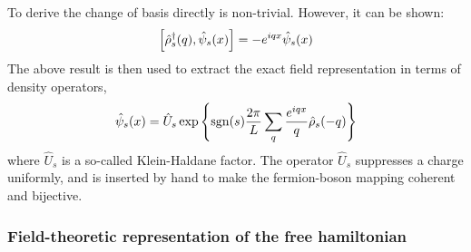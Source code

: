 To derive the change of basis directly is non-trivial. However, it can be shown:
\[
	\comm{\hat \rho_s^\dagger (q)}{\hat \psi_s (x)} = -e^{iqx} \hat \psi_s (x)
\]
The above result is then used to extract the exact field representation in terms of density operators,
\begin{equation}\label{eq:fermionic-fields-density-expression}
	\hat \psi_s (x) = \hat U_s \exp\left\{ \mathrm{sgn}(s) \frac{2\pi}{L} \sum_q \frac{e^{iqx}}{q} \hat \rho_s (-q) \right\}
\end{equation}
where $\hat U_s$ is a so-called Klein-Haldane factor. The operator $\hat U_s$ suppresses a charge uniformly, and is inserted by hand to make the fermion-boson mapping coherent and bijective.

\subsubsection{Field-theoretic representation of the free hamiltonian}

